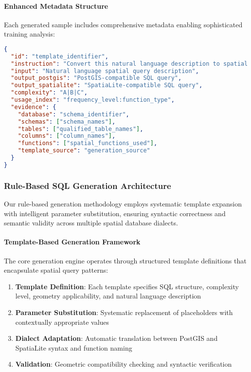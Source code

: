 \paragraph{Enhanced Metadata Structure}
Each generated sample includes comprehensive metadata enabling sophisticated training analysis:
\begin{lstlisting}[language=json,caption={Enhanced training sample structure}]
{
  "id": "template_identifier",
  "instruction": "Convert this natural language description to spatial SQL: ...",
  "input": "Natural language spatial query description",
  "output_postgis": "PostGIS-compatible SQL query",
  "output_spatialite": "SpatiaLite-compatible SQL query",
  "complexity": "A|B|C",
  "usage_index": "frequency_level:function_type",
  "evidence": {
    "database": "schema_identifier",
    "schemas": ["schema_names"],
    "tables": ["qualified_table_names"],
    "columns": ["column_names"],
    "functions": ["spatial_functions_used"],
    "template_source": "generation_source"
  }
}
\end{lstlisting}

\subsubsection{Rule-Based SQL Generation Architecture}
\label{subsubsec:rule-based-generation}

Our rule-based generation methodology employs systematic template expansion with intelligent parameter substitution, ensuring syntactic correctness and semantic validity across multiple spatial database dialects.

\paragraph{Template-Based Generation Framework}
The core generation engine operates through structured template definitions that encapsulate spatial query patterns:
\begin{enumerate}
    \item \textbf{Template Definition}: Each template specifies SQL structure, complexity level, geometry applicability, and natural language description
    \item \textbf{Parameter Substitution}: Systematic replacement of placeholders with contextually appropriate values
    \item \textbf{Dialect Adaptation}: Automatic translation between PostGIS and SpatiaLite syntax and function naming
    \item \textbf{Validation}: Geometric compatibility checking and syntactic verification
\end{enumerate}

